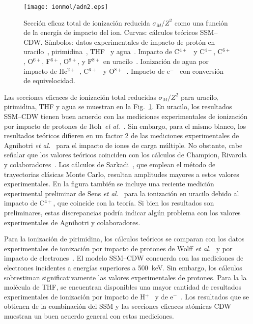 \begin{figure}
\centering
\texttt{[image: ionmol/adn2.eps]}
\caption[Sección eficaz total de ionización reducida por $Z$ 
(Parte II).]
{Sección eficaz total de ionización reducida $\sigma_{M}/Z^2$ como 
una función de la energía de impacto del ion. 
Curvas: cálculos teóricos SSM--CDW. 
Símbolos: datos experimentales de impacto de protón en 
uracilo~\cite{itoh2013}, 
pirimidina~\cite{wolff2014}, THF~\cite{wang2016} y agua~\cite{Luna2007,
Bolorizadeh86,H_Rudd85,toburen80}. Impacto de C$^{4+}$~\cite{Sens:20} y 
C$^{4+}$, C$^{6+}$, O$^{6+}$, F$^{6+}$, O$^{8+}$, y F$^{8+}$ en 
uracilo~\cite{agnihotri2012,agnihotri2013}. Ionización de agua por 
impacto de He$^{2+}$~\cite{Ohsawa05,He_Rudd85,toburen80}, 
C$^{6+}$~\cite{DalCappello:09,Bhattacharjee:17} y 
O$^{8+}$~\cite{Bhattacharjee:16}. 
Impacto de e$^-$~\cite{bug2017,wolf2019,fuss2009} con conversión de 
equivelocidad.}
\label{fig:crossDNA_2}
\end{figure} 

Las secciones eficaces de ionización total reducidas $\sigma_M/Z^2$ 
para uracilo, pirimidina, THF y agua se muestran en la 
Fig.~\ref{fig:crossDNA_2}. En uracilo, los resultados SSM--CDW tienen 
buen acuerdo con las mediciones experimentales de ionización por impacto 
de protones de Itoh~\textit{et al.}~\cite{itoh2013}. Sin embargo, para 
el mismo blanco, los resultados teóricos difieren en un factor 2 de las 
mediciones experimentales de 
Agnihotri \textit{et al.}~\cite{agnihotri2012,agnihotri2013} para el 
impacto de iones de carga múltiple. No obstante, cabe señalar que los 
valores teóricos coinciden con los cálculos de Champion, 
Rivarola y colaboradores~\cite{agnihotri2012,champion2012}. Los cálculos 
de Sarkadi~\cite{sarkadi2016}, que emplean el método de trayectorias 
clásicas Monte Carlo, resultan amplitudes mayores a estos valores 
experimentales. En la figura también se incluye una reciente medición 
experimental preliminar de Sens \textit{et al.}~\cite{Sens:20} para la 
ionización en uracilo debido al impacto de C$^{4+}$, que coincide con la 
teoría. Si bien los resultados son preliminares, estas discrepancias 
podría indicar algún problema con los valores experimentales de 
Agnihotri y colaboradores. 

Para la ionización de pirimidina, los cálculos teóricos se comparan con 
los datos experimentales de ionización por impacto de protones de Wolff 
\textit{et al.}~\cite{wolff2014} y por impacto de 
electrones~\cite{bug2017}. El modelo SSM--CDW concuerda con las 
mediciones de electrones incidentes a energías superiores a 500~keV. Sin 
embargo, los cálculos sobrestiman significativamente las valores 
experimentales de protones. Para la la molécula de THF, se encuentran 
disponibles una mayor cantidad de resultados experimentales de 
ionización por impacto de H$^+$~\cite{wang2016} y de 
e$^-$~\cite{bug2017,wolf2019,fuss2009}. Los resultados que se obtienen 
de la combinación del SSM y las secciones eficaces atómicas CDW muestran 
un buen acuerdo general con estas mediciones.

